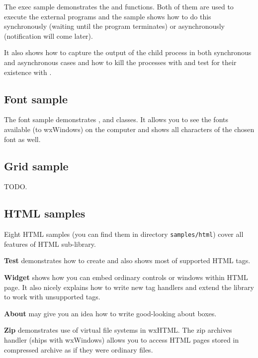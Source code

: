 The exec sample demonstrates the  and 
 functions. Both of them are used to execute the
external programs and the sample shows how to do this synchronously (waiting
until the program terminates) or asynchronously (notification will come later).

It also shows how to capture the output of the child process in both
synchronous and asynchronous cases and how to kill the processes with 
 and test for their existence with 
.

\subsection{Font sample}\label{samplefont}

The font sample demonstrates , 
 and 
 classes. It allows you to see the fonts
available (to wxWindows) on the computer and shows all characters of the
chosen font as well.

\subsection{Grid sample}\label{samplegrid}

TODO.

\subsection{HTML samples}\label{samplehtml}

Eight HTML samples (you can find them in directory {\tt samples/html})
cover all features of HTML sub-library.

{\bf Test} demonstrates how to create  
and also shows most of supported HTML tags.

{\bf Widget} shows how you can embed ordinary controls or windows within
HTML page. It also nicely explains how to write new tag handlers and extend
the library to work with unsupported tags.

{\bf About} may give you an idea how to write good-looking about boxes.

{\bf Zip} demonstrates use of virtual file systems in wxHTML. The zip archives
handler (ships with wxWindows) allows you to access HTML pages stored 
in compressed archive as if they were ordinary files.

